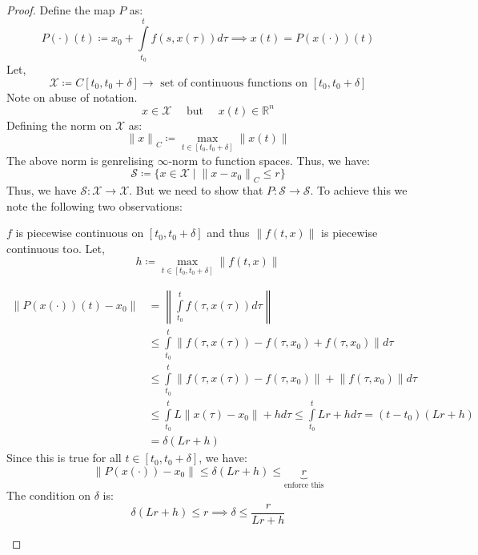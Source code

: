 \begin{proof}
    Define the map \(P\) as:
    \[
        P(\cdot)(t) \coloneqq  x_0 + \int\limits_{t_0}^{t} f(s, x(\tau)) d\tau \implies x(t) = P(x(\cdot))(t)
    \]
    Let,
    \[
        \mathcal{X}  \coloneqq  C[t_0, t_0 + \delta] \to \text{ set of continuous functions on } [t_0, t_0 + \delta] 
    \]
    Note on abuse of notation. 
    \[
        x \in \mathcal{X} \quad \text{ but } \quad x(t) \in \mathbb{R}^n
    \]
    Defining the norm on \(\mathcal{X}\) as:
    \[
        {\lVert x \rVert}_C \coloneqq \max\limits_{t \in [t_0, t_0 + \delta]} \lVert x(t) \rVert  
    \]
    The above norm is genrelising \(\infty \)-norm to function spaces.
    Thus, we have:
    \[
        \mathcal{S} \coloneqq \{x \in \mathcal{X} \mid {\lVert x - x_0 \rVert}_C \leq r\}
    \]
    Thus, we have \(\mathcal{S} : \mathcal{X} \to \mathcal{X}\). But we need to show that 
    \( P : \mathcal{S} \to \mathcal{S}\). To achieve this we note the following two observations:
    \begin{observe}[1]
        \(f\) is piecewise continuous on \([t_0, t_0 + \delta]\) and thus \( \lVert f(t,x) \rVert\) 
        is piecewise continuous too.
        Let,
        \[
            h \coloneqq \max\limits_{t \in [t_0, t_0 + \delta]} \lVert f(t,x) \rVert
        \]
    \end{observe}
    \begin{observe}[2]
        \[
            \begin{aligned}
                \lVert P(x(\cdot))(t) - x_0 \rVert &= \left\lVert \int\limits_{t_0}^{t} f(\tau, x(\tau)) d\tau \right\rVert \\
                &\leq \int\limits_{t_0}^{t} \left\lVert f(\tau , x(\tau)) - f(\tau, x_0) + f(\tau, x_0) \right\rVert d\tau\\
                &\leq \int\limits_{t_0}^{t} \lVert f(\tau, x(\tau)) - f(\tau, x_0) \rVert +
                 \lVert f(\tau, x_0) \rVert d\tau \\
                &\leq \int\limits_{t_0}^{t} L \lVert x(\tau) - x_0 \rVert + h d\tau 
                \leq \int\limits_{t_0}^{t} L r + h d\tau = (t - t_0) (Lr + h) \\&= \delta (Lr + h)
            \end{aligned}
        \]
        Since this is true for all \(t \in [t_0, t_0 + \delta]\), we have:
        \[
            \lVert P(x(\cdot)) - x_0 \rVert \leq \delta (Lr + h) \leq \underbrace{r}_{\text{enforce this}}
        \]
        The condition on \(\delta \) is:
        \[
            \delta (Lr + h) \leq r \implies \delta \leq \frac{r}{Lr + h}  
        \]
    \end{observe}
\end{proof}
